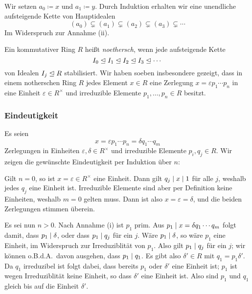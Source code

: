 Wir setzen $a_0 \coloneqq x$ und $a_1 \coloneqq y$.
Durch Induktion erhalten wir eine unendliche aufsteigende Kette von Hauptidealen
\[
              (a_0)
  \subsetneq  (a_1)
  \subsetneq  (a_2)
  \subsetneq  (a_3)
  \subsetneq  \dotsb
\]
Im Widerspruch zur Annahme (ii).

\begin{remark}
  Ein kommutativer Ring $R$ heißt \emph{noethersch}, wenn jede aufsteigende Kette
  \[
            I_0
    \trianglelefteq  I_1
    \trianglelefteq  I_2
    \trianglelefteq  I_3
    \trianglelefteq \dotsb
  \]
  von Idealen $I_j \trianglelefteq R$ stabilisiert.
  Wir haben soeben insbesondere gezeigt, dass in einem notherschen Ring $R$ jedes Element $x \in R$ eine Zerlegung $x = \varepsilon p_1 \dotsm p_n$ in eine Einheit $\varepsilon \in R^\times$ und irreduzible Elemente $p_1, \dotsc, p_n \in R$ besitzt.
\end{remark}




\subsubsection*{Eindeutigkeit}

Es seien
\[
    x
  = \varepsilon p_1 \dotsm p_n
  = \delta q_1 \dotsm q_m
\]
Zerlegungen in Einheiten $\varepsilon, \delta \in R^\times$ und irreduzible Elemente $p_i, q_j \in R$.
Wir zeigen die gewünschte Eindeutigkeit per Induktion über $n$:

Gilt $n = 0$, so ist $x = \varepsilon \in R^\times$ eine Einheit.
Dann gilt $q_j \mathrel{|} x \mathrel{|} 1$ für alle $j$, weshalb jedes $q_j$ eine Einheit ist.
Irreduzible Elemente sind aber per Definition keine Einheiten, weshalb $m = 0$ gelten muss.
Dann ist also $x = \varepsilon = \delta$, und die beiden Zerlegungen stimmen überein.

Es sei nun $n > 0$.
Nach Annahme (i) ist $p_1$ prim.
Aus $p_1 \mathrel{|} x = \delta q_1 \dotsm q_m$ folgt damit, dass $p_1 \mathrel{|} \delta$, oder dass $p_1 \mathrel{|} q_j$ für ein $j$.
Wäre $p_1 \mathrel{|} \delta$, so wäre $p_1$ eine Einheit, im Widerspruch zur Irreduziblität von $p_1$.
Also gilt $p_1 \mathrel{|} q_j$ für ein $j$;
wir können o.B.d.A.\ davon ausgehen, dass $p_1 \mathrel{|} q_1$.
Es gibt also $\delta' \in R$ mit $q_1 = p_1 \delta'$.
Da $q_1$ irreduzibel ist folgt dabei, dass bereits $p_1$ oder $\delta'$ eine Einheit ist;
$p_1$ ist wegen Irreduziblität keine Einheit, so dass $\delta'$ eine Einheit ist.
Also sind $p_1$ und $q_1$ gleich bis auf die Einheit $\delta'$.

